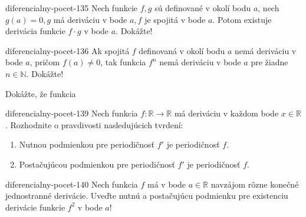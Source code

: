 \begin{defproblem}{diferencialny-pocet-135}
Nech funkcie $f,g$ sú definované v okolí bodu $a$, nech $g(a)=0,g$ má deriváciu v bode $a,f$ je spojitá v bode $a$. Potom existuje derivácia funkcie $f\cdot g$ v bode $a$. Dokážte!
\end{defproblem}

\begin{defproblem}{diferencialny-pocet-136}
Ak spojitá $f$ definovaná v okolí bodu $a$ nemá deriváciu v bode $a$, pričom $f(a)\neq 0$, tak funkcia $f^{n}$ nemá deriváciu v bode $a$ pre žiadne $n\in\mathbb{N}$. Dokážte!
\end{defproblem}

Dokážte, že funkcia 


\begin{defproblem}{diferencialny-pocet-139}
Nech funkcia $f:\mathbb{R}\rightarrow\mathbb{R}$ má deriváciu v každom bode $x\in\mathbb{R}$. Rozhodnite o pravdivosti nasledujúcich tvrdení:
\begin{enumerate}
\item Nutnou podmienkou pre periodičnosť $f'$ je periodičnosť $f$.
\item Postačujúcou podmienkou pre periodičnosť $f'$ je periodičnosť $f$.
\end{enumerate}
\end{defproblem}

\begin{defproblem}{diferencialny-pocet-140}
Nech funkcia $f$ má v bode $a\in\mathbb{R}$ navzájom rôzne konečné jednostranné derivácie. Uveďte nutnú a postačujúcu podmienku pre existenciu derivácie funkcie $f^2$ v bode $a$!
\end{defproblem}

